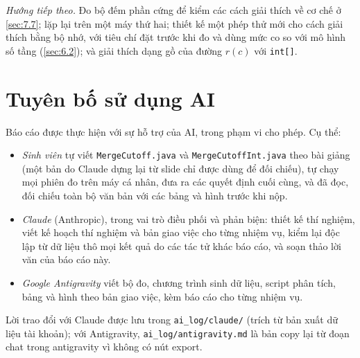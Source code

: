 \documentclass[12pt,a4paper]{article}
\begin{document}
\emph{Hướng tiếp theo.} Đo bộ đếm phần cứng để kiểm các cách giải thích về cơ chế ở \cref{sec:7.7}; lặp lại trên một máy thứ hai; thiết kế một phép thử mới cho cách giải thích bằng bộ nhớ, với tiêu chí đặt trước khi đo và dùng mức co so với mô hình số tầng (\cref{sec:6.2}); và giải thích dạng gồ của đường $r(c)$ với \texttt{int[]}.

\section*{Tuyên bố sử dụng AI}\label{sec:K}
Báo cáo được thực hiện với sự hỗ trợ của AI, trong phạm vi cho phép. Cụ thể:
\begin{itemize}
\item \emph{Sinh viên} tự viết \texttt{MergeCutoff.java} và \texttt{MergeCutoffInt.java} theo bài giảng (một bản do Claude dựng lại từ slide chỉ được dùng để đối chiếu), tự chạy mọi phiên đo trên máy cá nhân, đưa ra các quyết định cuối cùng, và đã đọc, đối chiếu toàn bộ văn bản với các bảng và hình trước khi nộp.
\item \emph{Claude} (Anthropic), trong vai trò điều phối và phản biện: thiết kế thí nghiệm, viết kế hoạch thí nghiệm và bản giao việc cho từng nhiệm vụ, kiểm lại độc lập từ dữ liệu thô mọi kết quả do các tác tử khác báo cáo, và soạn thảo lời văn của báo cáo này.
\item \emph{Google Antigravity} viết bộ đo, chương trình sinh dữ liệu, script phân tích, bảng và hình theo bản giao việc, kèm báo cáo cho từng nhiệm vụ.
\end{itemize}
Lời trao đổi với Claude được lưu trong \texttt{ai\_log/claude/} (trích từ bản xuất dữ liệu tài khoản); với Antigravity, \texttt{ai\_log/antigravity.md} là bản copy lại từ đoạn chat trong antigravity vì không có nút export.

\clearpage
{}


\end{document}

